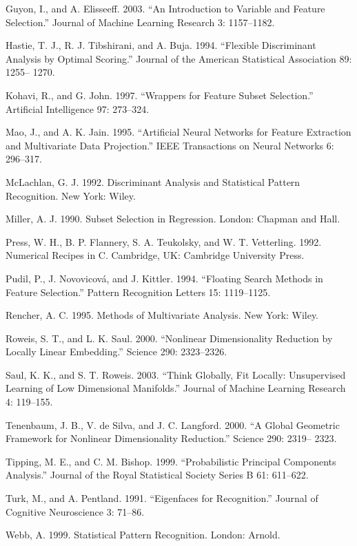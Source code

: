 Guyon, I., and A. Elisseeff. 2003. “An Introduction to Variable and Feature Selection.” Journal of Machine Learning Research 3: 1157--1182.

Hastie, T. J., R. J. Tibshirani, and A. Buja. 1994. “Flexible Discriminant Analysis by Optimal Scoring.” Journal of the American Statistical Association 89: 1255-- 1270.

Kohavi, R., and G. John. 1997. “Wrappers for Feature Subset Selection.” Artificial Intelligence 97: 273--324.

Mao, J., and A. K. Jain. 1995. “Artificial Neural Networks for Feature Extraction and Multivariate Data Projection.” IEEE Transactions on Neural Networks 6: 296--317.

McLachlan, G. J. 1992. Discriminant Analysis and Statistical Pattern Recognition. New York: Wiley.

Miller, A. J. 1990. Subset Selection in Regression. London: Chapman and Hall.

Press, W. H., B. P. Flannery, S. A. Teukolsky, and W. T. Vetterling. 1992. Numerical Recipes in C. Cambridge, UK: Cambridge University Press.

Pudil, P., J. Novovicová, and J. Kittler. 1994. “Floating Search Methods in Feature Selection.” Pattern Recognition Letters 15: 1119--1125.

Rencher, A. C. 1995. Methods of Multivariate Analysis. New York: Wiley.

Roweis, S. T., and L. K. Saul. 2000. “Nonlinear Dimensionality Reduction by Locally Linear Embedding.” Science 290: 2323--2326.

Saul, K. K., and S. T. Roweis. 2003. “Think Globally, Fit Locally: Unsupervised Learning of Low Dimensional Manifolds.” Journal of Machine Learning Research 4: 119--155.

Tenenbaum, J. B., V. de Silva, and J. C. Langford. 2000. “A Global Geometric Framework for Nonlinear Dimensionality Reduction.” Science 290: 2319-- 2323.

Tipping, M. E., and C. M. Bishop. 1999. “Probabilistic Principal Components Analysis.” Journal of the Royal Statistical Society Series B 61: 611--622.

Turk, M., and A. Pentland. 1991. “Eigenfaces for Recognition.” Journal of Cognitive Neuroscience 3: 71--86.

Webb, A. 1999. Statistical Pattern Recognition. London: Arnold.

